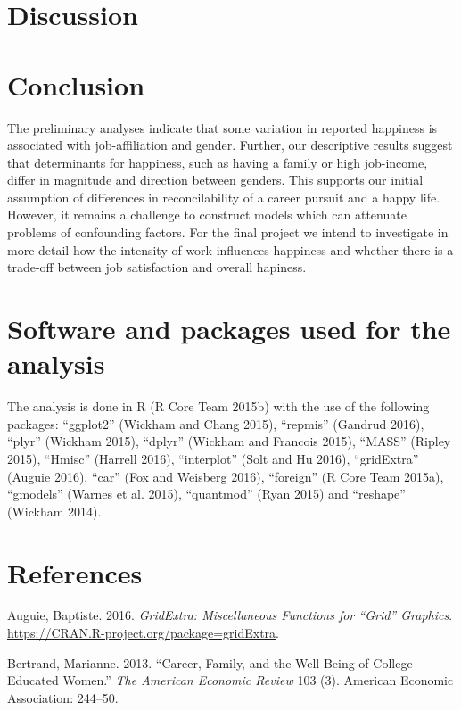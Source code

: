 \documentclass[]{article}
\begin{document}
\section{Discussion}\label{discussion}

\section{Conclusion}\label{conclusion}

The preliminary analyses indicate that some variation in reported
happiness is associated with job-affiliation and gender. Further, our
descriptive results suggest that determinants for happiness, such as
having a family or high job-income, differ in magnitude and direction
between genders. This supports our initial assumption of differences in
reconcilability of a career pursuit and a happy life. However, it
remains a challenge to construct models which can attenuate problems of
confounding factors. For the final project we intend to investigate in
more detail how the intensity of work influences happiness and whether
there is a trade-off between job satisfaction and overall hapiness.

\section{Software and packages used for the
analysis}\label{software-and-packages-used-for-the-analysis}

The analysis is done in R (R Core Team 2015b) with the use of the
following packages: ``ggplot2'' (Wickham and Chang 2015), ``repmis''
(Gandrud 2016), ``plyr'' (Wickham 2015), ``dplyr'' (Wickham and Francois
2015), ``MASS'' (Ripley 2015), ``Hmisc'' (Harrell 2016), ``interplot''
(Solt and Hu 2016), ``gridExtra'' (Auguie 2016), ``car'' (Fox and
Weisberg 2016), ``foreign'' (R Core Team 2015a), ``gmodels'' (Warnes et
al. 2015), ``quantmod'' (Ryan 2015) and ``reshape'' (Wickham 2014).

\section*{References}\label{references}

\hypertarget{refs}{}
\hypertarget{ref-R-gridExtra}{}
Auguie, Baptiste. 2016. \emph{GridExtra: Miscellaneous Functions for
``Grid'' Graphics}. \url{https://CRAN.R-project.org/package=gridExtra}.

\hypertarget{ref-bertrand2013}{}
Bertrand, Marianne. 2013. ``Career, Family, and the Well-Being of
College-Educated Women.'' \emph{The American Economic Review} 103 (3).
American Economic Association: 244--50.
\end{document}
